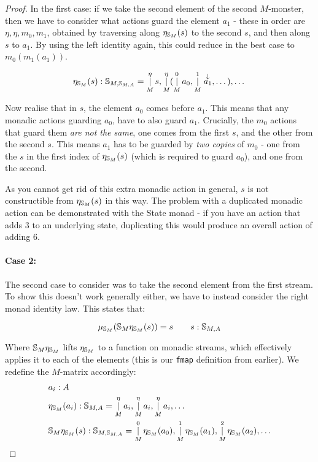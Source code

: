 \documentclass{article}
\begin{document}
\begin{proof}
In the first case: if we take the second element of the second $M$-monster, then we have to consider what actions guard the element $a_1$ - these in order are $\eta, \eta, m_0, m_1$, obtained by traversing along $\eta_{\mathbb{S}_{M}}(s)$ to the second $s$, and then along $s$ to $a_1$. By using the left identity again, this could reduce in the best case to $m_0(m_1(a_1))$.

$$
\eta_{\mathbb{S}_{M}}(s) : \mathbb{S}_{M,\mathbb{S}_{M,A}} = \mathop{|}_M^\eta s, \mathop{|}_M^\eta (\mathop{|}_M^0 a_0, \mathop{|}_M^1 \stackrel{\downarrow}{a_1}, \dots), \dots
$$

Now realise that in $s$, the element $a_0$ comes before $a_1$. This means that any monadic actions guarding $a_0$, have to also guard $a_1$. Crucially, the $m_0$ actions that guard them \emph{are not the same}, one comes from the first $s$, and the other from the second $s$. This means $a_1$ has to be guarded by \emph{two copies} of $m_0$ - one from the $s$ in the first index of $\eta_{\mathbb{S}_{M}}(s)$ (which is required to guard $a_0$), and one from the second. 

As you cannot get rid of this extra monadic action in general, $s$ is not constructible from $\eta_{\mathbb{S}_{M}}(s)$ in this way. The problem with a duplicated monadic action can be demonstrated with the State monad - if you have an action that adds $3$ to an underlying state, duplicating this would produce an overall action of adding $6$.\\


\paragraph{Case 2:} 

The second case to consider was to take the second element from the first stream. To show this doesn't work generally either, we have to instead consider the right monad identity law. This states that:

$$
\mu_{\mathbb{S}_{M}}(\mathbb{S}_{M}\eta_{\mathbb{S}_{M}}(s)) = s
\qquad s : \mathbb{S}_{M,A}
$$

Where $\mathbb{S}_{M}\eta_{\mathbb{S}_{M}}$ lifts $\eta_{\mathbb{S}_{M}}$ to a function on monadic streams, which effectively applies it to each of the elements (this is our \verb+fmap+ definition from earlier). We redefine the $M$-matrix accordingly:
\begin{align*}
&a_i : A\\
&\eta_{\mathbb{S}_{M}}(a_i) : \mathbb{S}_{M,A} = \mathop{|}_M^\eta a_i, \mathop{|}_M^\eta a_i, \mathop{|}_M^\eta  a_i, \dots\\
&\mathbb{S}_{M}\eta_{\mathbb{S}_{M}}(s) : \mathbb{S}_{M,\mathbb{S}_{M,A}} = \mathop{|}_M^0 \eta_{\mathbb{S}_{M}}(a_0), \mathop{|}_M^1 \eta_{\mathbb{S}_{M}}(a_1), \mathop{|}_M^2 \eta_{\mathbb{S}_{M}}(a_2), \dots
\end{align*}


\end{proof}
\end{document}
